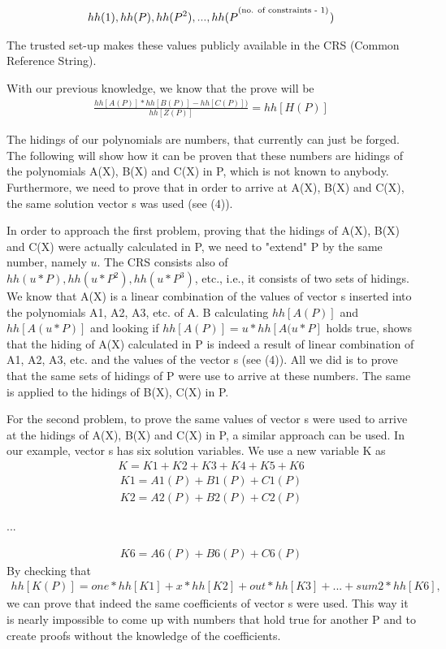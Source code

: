 \begin{align}
    hh(1), hh(P), hh(P^2), ..., hh(P^\textsuperscript{(no. of constraints - 1)})
\end{align}

The trusted set-up makes these values publicly available in the CRS (Common Reference String).

With our previous knowledge, we know that the prove will be
\begin{align}
    \frac{hh[A(P)] * hh[B(P)] - hh[C(P)])}{hh[Z(P)]} = hh[H(P)]
\end{align}

The hidings of our polynomials are numbers, that currently can just be forged. The following will show how it can be proven that these numbers are hidings of the polynomials A(X), B(X) and C(X) in P, which is not known to anybody. Furthermore, we need to prove that in order to arrive at A(X), B(X) and C(X), the same solution vector s was used (see (4)). 

In order to approach the first problem, proving that the hidings of A(X),  B(X) and C(X) were actually calculated in P, we need to "extend" P by the same number, namely \(u\). The CRS consists also of \(hh(u*P), hh(u*P^2), hh(u*P^3)\), etc., i.e., it consists of two sets of hidings. We know that A(X) is a linear combination of the values of vector s inserted into the polynomials A1, A2, A3, etc. of A. B calculating \(hh[A(P)]\) and \(hh[A(u*P)]\) and looking if \(hh[A(P)] = u * hh[A(u*P]\) holds true, shows that the hiding of A(X) calculated in P is indeed a result of linear combination of A1, A2, A3, etc. and the values of the vector s (see (4)). All we did is to prove that the same sets of hidings of P were use to arrive at these numbers. The same is applied to the hidings of B(X), C(X) in P.

For the second problem, to prove the same values of vector s were used to arrive at the hidings of A(X), B(X) and C(X) in P, a similar approach can be used. In our example, vector s has six solution variables. We use a new variable K as
\begin{align}
    K = K1 + K2 + K3 + K4 + K5 + K6
\end{align}
\begin{align*}
    K1 = A1(P) + B1(P) + C1(P)\\K2 = A2(P) + B2(P) + C2(P)
\end{align*}
\begin{center}
    ... \\
\end{center}
\begin{align*}
    K6 = A6(P) + B6(P) + C6(P)
\end{align*}
By checking that 
\begin{align}
    hh[K(P)] = one*hh[K1] + x * hh[K2] + out * hh[K3] + ... + sum2 * hh[K6],
\end{align}
we can prove that indeed the same coefficients of vector s were used. This way it is nearly impossible to come up with numbers that hold true for another P and to create proofs without the knowledge of the coefficients.

